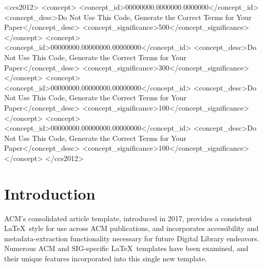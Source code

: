 \documentclass[acmsmall]{acmart}
\begin{document}
	\begin{CCSXML}
		<ccs2012>
		<concept>
		<concept_id>00000000.0000000.0000000</concept_id>
		<concept_desc>Do Not Use This Code, Generate the Correct Terms for Your Paper</concept_desc>
		<concept_significance>500</concept_significance>
		</concept>
		<concept>
		<concept_id>00000000.00000000.00000000</concept_id>
		<concept_desc>Do Not Use This Code, Generate the Correct Terms for Your Paper</concept_desc>
		<concept_significance>300</concept_significance>
		</concept>
		<concept>
		<concept_id>00000000.00000000.00000000</concept_id>
		<concept_desc>Do Not Use This Code, Generate the Correct Terms for Your Paper</concept_desc>
		<concept_significance>100</concept_significance>
		</concept>
		<concept>
		<concept_id>00000000.00000000.00000000</concept_id>
		<concept_desc>Do Not Use This Code, Generate the Correct Terms for Your Paper</concept_desc>
		<concept_significance>100</concept_significance>
		</concept>
		</ccs2012>
	\end{CCSXML}
	
	
	
	
	\maketitle
	
	\section{Introduction}
	ACM's consolidated article template, introduced in 2017, provides a
	consistent \LaTeX\ style for use across ACM publications, and
	incorporates accessibility and metadata-extraction functionality
	necessary for future Digital Library endeavors. Numerous ACM and
	SIG-specific \LaTeX\ templates have been examined, and their unique
	features incorporated into this single new template.
	
\end{document}
